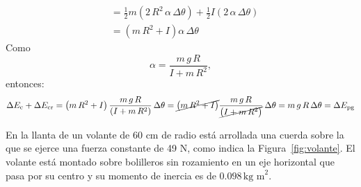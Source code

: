 \documentclass[addpoints]{exam}
\begin{document}
\begin{questions}
\begin{solution}
\begin{equation*}
\begin{split}
        &= \frac{1}{2} m \left(2 \, R^2 \, \alpha \, \Delta \theta\right) + \frac{1}{2} I \left(2 \, \alpha \, \Delta \theta\right) \\
        &= \left(m \, R^2 + I\right) \alpha \, \Delta \theta
        \end{split}
    \end{equation*} Como $$\alpha = \frac{m \, g \, R}{I + m \, R^2},$$ entonces: $$ \Delta E_\text{c} + \Delta E_\text{cr} = \left(m \, R^2 + I\right) \frac{m \, g \, R}{\left(I + m \, R^2\right)} \, \Delta \theta = \cancel{\left(m \, R^2 + I\right)} \frac{m \, g \, R}{\cancel{\left(I + m \, R^2\right)}} \, \Delta \theta = m \, g \, R \, \Delta \theta = \Delta E_\text{pg}$$
    \end{solution}

    \question En la llanta de un volante de 60 cm de radio está arrollada una cuerda sobre la que se ejerce una fuerza constante de 49 N, como indica la Figura~\ref{fig:volante}. El volante está montado sobre bolilleros sin rozamiento en un eje horizontal que pasa por su centro y su momento de inercia es de $0.098 \, \text{kg m}^2$. 


\end{questions}
\end{document}
